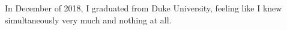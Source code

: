 


In December of 2018, I graduated from Duke University, feeling like I knew simultaneously very much and nothing at all.





